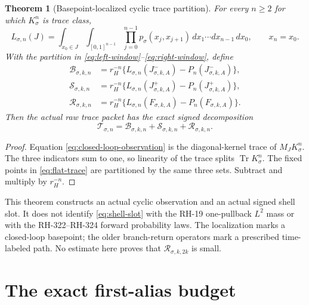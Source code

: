 \documentclass[11pt]{article}
\newtheorem{theorem}{Theorem}[section]
\theoremstyle{remark}
\newcommand{\Tr}{\operatorname{Tr}}
\newcommand{\cB}{\mathcal B}
\newcommand{\cR}{\mathcal R}
\newcommand{\cS}{\mathcal S}
\newcommand{\cT}{\mathcal T}
\begin{document}
\begin{theorem}[Basepoint-localized cyclic trace partition]
\label{thm:localized-partition}
For every $n\ge2$ for which $K_\sigma^n$ is trace class,
\begin{equation}
 L_{\sigma,n}(J)
 =\int_{x_0\in J}\int_{[0,1]^{n-1}}
   \prod_{j=0}^{n-1}p_\sigma(x_j,x_{j+1})
   \,dx_1\cdots dx_{n-1}\,dx_0,
 \qquad x_n=x_0.
 \label{eq:closed-loop-observation}
\end{equation}
With the partition in \eqref{eq:left-window}--\eqref{eq:right-window}, define
\begin{align}
 \cB_{\sigma,k,n}
 &=r_H^{-n}\{L_{\sigma,n}(J^-_{\sigma,k,A})
                   -P_n(J^-_{\sigma,k,A})\},
 \label{eq:boundary-slot}\\
 \cS_{\sigma,k,n}
 &=r_H^{-n}\{L_{\sigma,n}(J^+_{\sigma,k,A})
                   -P_n(J^+_{\sigma,k,A})\},
 \label{eq:shell-slot}\\
 \cR_{\sigma,k,n}
 &=r_H^{-n}\{L_{\sigma,n}(F_{\sigma,k,A})
                   -P_n(F_{\sigma,k,A})\}.
 \label{eq:far-slot}
\end{align}
Then the actual raw trace packet has the exact signed decomposition
\begin{equation}
 \boxed{\cT_{\sigma,n}
 =\cB_{\sigma,k,n}+\cS_{\sigma,k,n}+\cR_{\sigma,k,n}.}
 \label{eq:raw-decomposition}
\end{equation}
\end{theorem}

\begin{proof}
Equation \eqref{eq:closed-loop-observation} is the diagonal-kernel trace of
$M_JK_\sigma^n$.  The three indicators sum to one, so linearity of the trace
splits $\Tr K_\sigma^n$.  The fixed points in \eqref{eq:flat-trace} are
partitioned by the same three sets.  Subtract and multiply by $r_H^{-n}$.
\end{proof}

This theorem constructs an actual cyclic observation and an actual signed
shell slot.  It does not identify \eqref{eq:shell-slot} with the RH-19
one-pullback $L^2$ mass or with the RH-322--RH-324 forward probability laws.
The localization marks a closed-loop basepoint; the older branch-return
operators mark a prescribed time-labeled path.  No estimate here proves that
$\cR_{\sigma,k,2k}$ is small.

\section{The exact first-alias budget}
\end{document}
